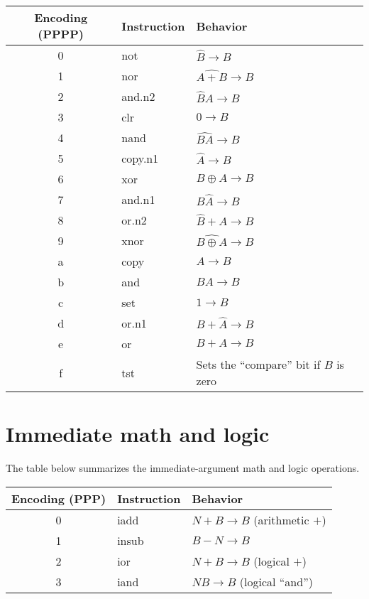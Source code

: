 \documentclass[10pt]{article}
\begin{document}
\begin{tabular}{|c||l|l|}
\hline
Encoding (PPPP) & Instruction & Behavior \\
\hline
\hline
0 & not & $\widehat B \to B$ \\
\hline
1 & nor & $\widehat{A+B} \to B$ \\
\hline
2 & and.n2 & $\widehat B A \to B$ \\
\hline
3 & clr & $0 \to B$ \\
\hline
4 & nand & $\widehat{BA} \to B$ \\
\hline
5 & copy.n1 & $\widehat A \to B$ \\
\hline
6 & xor & $B \oplus A \to B$ \\
\hline
7 & and.n1 & $B \widehat A \to B$ \\
\hline
8 & or.n2 & $\widehat B + A \to B$ \\
\hline
9 & xnor & $\widehat{B \oplus A} \to B$ \\
\hline
a & copy & $A \to B$ \\
\hline
b & and & $BA \to B$ \\
\hline
c & set & $1 \to B$ \\
\hline
d & or.n1 & $B + \widehat A \to B$ \\
\hline
e & or & $B + A \to B$ \\
\hline
f & tst & Sets the ``compare'' bit if $B$ is zero \\
\hline
\end{tabular}


\section{Immediate math and logic}

The table below summarizes the immediate-argument math and logic operations.

\begin{tabular}{|c||l|l|}
\hline
Encoding (PPP) & Instruction & Behavior \\
\hline
\hline
0 & iadd & $N+B \to B$ (arithmetic $+$) \\
\hline
1 & insub & $B-N \to B$ \\
\hline
2 & ior & $N+B \to B$ (logical $+$) \\
\hline
3 & iand & $NB \to B$ (logical ``and'') \\
\hline
\end{tabular}
\end{document}
